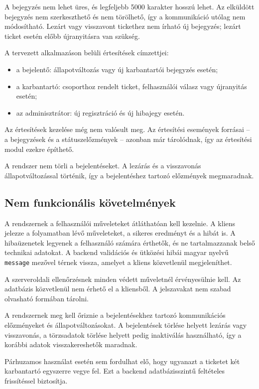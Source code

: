 \documentclass[12pt, a4paper, twoside]{article}
\begin{document}
A bejegyzés nem lehet üres, és legfeljebb 5000 karakter hosszú lehet. Az elküldött bejegyzés nem szerkeszthető és nem törölhető, így a kommunikáció utólag nem módosítható. Lezárt vagy visszavont tickethez nem írható új bejegyzés; lezárt ticket esetén előbb újranyitásra van szükség.

A tervezett alkalmazáson belüli értesítések címzettjei:

\begin{itemize}
    \item a bejelentő: állapotváltozás vagy új karbantartói bejegyzés esetén;
    \item a karbantartó: csoporthoz rendelt ticket, felhasználói válasz vagy újranyitás esetén;
    \item az adminisztrátor: új regisztráció és új hibajegy esetén.
\end{itemize}

Az értesítések kezelése még nem valósult meg. Az értesítési események forrásai -- a bejegyzések és a státuszelőzmények -- azonban már tárolódnak, így az értesítési modul ezekre építhető.

A rendszer nem törli a bejelentéseket. A lezárás és a visszavonás állapotváltozással történik, így a bejelentéshez tartozó előzmények megmaradnak.

\subsection{Nem funkcionális követelmények}

A rendszernek a felhasználói műveleteket átláthatóan kell kezelnie. A kliens jelezze a folyamatban lévő műveleteket, a sikeres eredményt és a hibát is. A hibaüzenetek legyenek a felhasználó számára érthetők, és ne tartalmazzanak belső technikai adatokat. A backend validációs és ütközési hibái magyar nyelvű \texttt{message} mezővel térnek vissza, amelyet a kliens közvetlenül megjeleníthet.

A szerveroldali ellenőrzésnek minden védett műveletnél érvényesülnie kell. Az adatbázis közvetlenül nem érhető el a kliensből. A jelszavakat nem szabad olvasható formában tárolni.

A rendszernek meg kell őriznie a bejelentésekhez tartozó kommunikációs előzményeket és állapotváltozásokat. A bejelentések törlése helyett lezárás vagy visszavonás, a törzsadatok törlése helyett pedig inaktiválás használható, így a korábbi adatok visszakereshetők maradnak.

Párhuzamos használat esetén sem fordulhat elő, hogy ugyanazt a ticketet két karbantartó egyszerre vegye fel. Ezt a backend adatbázisszintű feltételes frissítéssel biztosítja.
\end{document}
